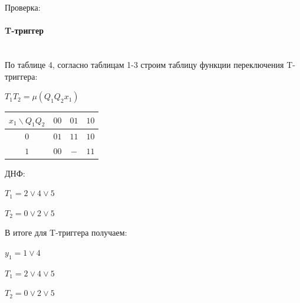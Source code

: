 Проверка:
\begin{table}[H]
\tiny
{}
\end{table}


\paragraph{T-триггер}\mbox{}\\

По таблице 4, согласно таблицам 1-3 строим таблицу функции
переключения T-триггера:

$T_1T_2 = \mu(Q_1Q_2x_1)$

\begin{table}[!h]
\begin{tabular}{|c|c|c|c|}
\hline
$x_1 \backslash Q_1Q_2$ & $00$ & $01$ & $10$ \\ \hline
$0$          & $01$ & $11$ & $10$ \\ \hline
$1$          & $00$ & $- $ & $11$  \\ \hline
\end{tabular}
\end{table}

ДНФ:

$T_1 = 2 \vee 4 \vee 5$

$T_2 = 0 \vee 2 \vee 5$

В итоге для T-триггера получаем:

$y_1 = 1 \vee 4$

$T_1 = 2 \vee 4 \vee 5$

$T_2 = 0 \vee 2 \vee 5$

